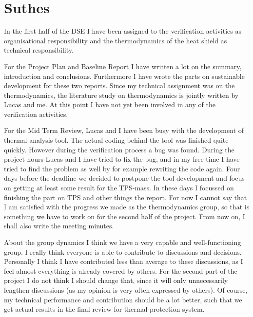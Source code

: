 \section{Suthes}

In the first half of the DSE I have been assigned to the verification activities as organisational responsibility and the thermodynamics of the heat shield as technical responsibility.

For the Project Plan and Baseline Report I have written a lot on the summary, introduction and conclusions. Furthermore I have wrote the parts on sustainable development for these two reports. Since my technical assignment was on the thermodynamics, the literature study on thermodynamics is jointly written by Lucas and me. At this point I have not yet been involved in any of the verification activities.

For the Mid Term Review, Lucas and I have been busy with the development of thermal analysis tool. The actual coding behind the tool was finished quite quickly. However during the verification process a bug was found. During the project hours Lucas and I have tried to fix the bug, and in my free time I have tried to find the problem as well by for example rewriting the code again. Four days before the deadline we decided to postpone the tool development and focus on getting at least some result for the TPS-mass. In these days I focussed on finishing the part on TPS and other things the report. For now I cannot say that I am satisfied with the progress we made as the thermodynamics group, so that is something we have to work on for the second half of the project. From now on, I shall also write the meeting minutes.

About the group dynamics I think we have a very capable and well-functioning group. I really think everyone is able to contribute to discussions and decisions. Personally I think I have contributed less than average to these discussions, as I feel almost everything is already covered by others. For the second part of the project I do not think I should change that, since it will only unnecessarily lengthen discussions (as my opinion is very often expressed by others). Of course, my technical performance and contribution should be a lot better, such that we get actual results in the final review for thermal protection system.

